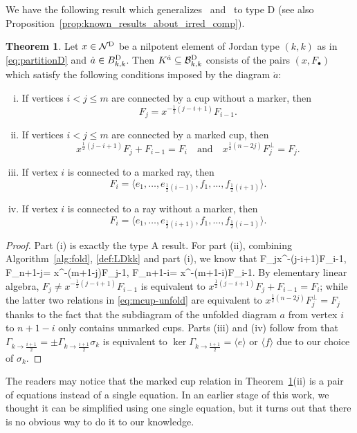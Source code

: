 \documentclass[11pt,reqno]{amsart}
\numberwithin{equation}{section}
\theoremstyle{definition}
\newtheorem{theorem}{Theorem}[section]
\def\<{\langle}
\def\>{\rangle}
\newcommand{\BD}{{B}^\textup{D}}
\newcommand{\cBD}{\mathcal{B}^\textup{D}}\newcommand{\CC}{\mathbb{C}}
\newcommand{\cND}{\mathcal{N}^{\textup{D}}}
\newcommand{\da}{\dot{a}}
\begin{document}
We have the following result which generalizes~\cite{Fun03} and~\cite{SW12} to type D (see also Proposition~\ref{prop:known_results_about_irred_comp}).
\begin{theorem}\label{thm:main2a}
Let $x \in \cND$ be a nilpotent element of Jordan type $(k,k)$ as in \eqref{eq:partitionD} and $\da\in \BD_{k,k}$.
Then $K^{\da}\subseteq \cBD_{k,k}$ consists of the pairs $(x, F_\bullet)$ which satisfy the following conditions imposed by the diagram $\da$:
\begin{enumerate}[(i)]
\item If vertices $i < j \leq m$ are connected by a cup without a marker, then 
\[
F_{j}=x^{-\frac{1}{2}(j-i+1)}F_{i-1}.
\]
\item If vertices $i < j \leq m$ are connected by a marked cup, then 
\[
x^{\frac{1}{2}(j-i+1)}F_j+F_{i-1} = F_i \hspace{1em} \text{and} \hspace{1em} 
x^{\frac{1}{2}(n-2j)}F_j^\perp = F_j .
\]
\item If vertex $i$ is connected to a marked ray, then 
\[
F_i=\langle e_1,\ldots,e_{\frac{1}{2}(i-1)},f_1,\ldots,f_{\frac{1}{2}(i+1)}\rangle.
\]
\item If vertex $i$ is connected to a ray without a marker, then 
\[
F_i=\langle e_1,\ldots,e_{\frac{1}{2}(i+1)},f_1,\ldots,f_{\frac{1}{2}(i-1)}\rangle.
\]
\end{enumerate}
\end{theorem}
\begin{proof}
Part (i) is exactly the type A result. For part (ii), 
combining Algorithm~\ref{alg:fold}, \eqref{def:LDkk} and part (i), we know that 
\eq\label{eq:mcup-unfold}
F_{j}\neq x^{-(j-i+1)}F_{i-1},
\quad
F_{n+1-j}= x^{-(m+1-j)}F_{j-1},
\quad
F_{n+1-i}= x^{-(m+1-i)}F_{i-1}.
\endeq
By elementary linear algebra, $F_{j}\neq x^{-\frac{1}{2}(j-i+1)}F_{i-1}$ is equivalent to $x^{\frac{1}{2}(j-i+1)}F_j+F_{i-1} = F_i$; while the latter two relations in \eqref{eq:mcup-unfold} are equivalent to 
$x^{\frac{1}{2}(n-2j)}F_j^\perp = F_j$ thanks to the fact that the subdiagram of the unfolded diagram $a$ from vertex $i$ to $n+1-i$ only contains unmarked cups.
Parts (iii) and (iv) follow from that
$\Gamma_{k \to \frac{i+1}{2}} = \pm \Gamma_{k \to \frac{i+1}{2}} \sigma_k$ is equivalent to $\ker \Gamma_{k \to \frac{i+1}{2}} = \<e\>$ or $\<f\>$ due to our choice of $\sigma_k$.
\end{proof}
\rmk
The readers  may notice that the marked cup relation in Theorem~\ref{thm:main2a}(ii) is a pair of equations instead of a single equation. 
In an earlier stage of this work, we thought it can be simplified using one single equation, but it turns out that there is no obvious way to do it to our knowledge.
\end{document}
